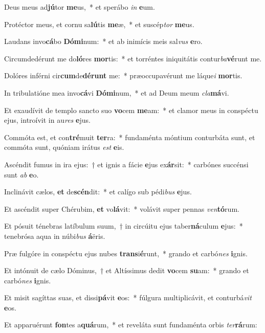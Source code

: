 \item Deus meus ad\textbf{jú}tor \textbf{me}us,~* et sperábo \textit{in} \textbf{e}um.
\item Protéctor meus, et cornu sa\textbf{lú}tis \textbf{me}æ,~* et suscép\textit{tor} \textbf{me}us.
\item Laudans invo\textbf{cá}bo \textbf{Dó}\textbf{mi}num:~* et ab inimícis meis sal\textit{vus} \textbf{e}ro.
\item Circumdedérunt me do\textbf{ló}res \textbf{mor}tis:~* et torréntes iniquitátis contur\textit{ba}\textbf{vé}runt me.
\item Dolóres inférni cir\textbf{cum}de\textbf{dé}\textbf{runt} me:~* præoccupavérunt me láque\textit{i} \textbf{mor}tis.
\item In tribulatióne mea invo\textbf{cá}vi \textbf{Dó}\textbf{mi}num,~* et ad Deum meum \textit{cla}\textbf{má}vi.
\item Et exaudívit de templo sancto suo \textbf{vo}cem \textbf{me}am:~* et clamor meus in conspéctu ejus, introívit in au\textit{res} \textbf{e}jus.
\item Commóta est, et con\textbf{tré}muit \textbf{ter}ra:~* fundaménta móntium conturbáta sunt, et commóta sunt, quóniam irátus \textit{est} \textbf{e}is.
\item Ascéndit fumus in ira ejus:~† et ignis a fácie \textbf{e}jus ex\textbf{ár}sit:~* carbónes succénsi sunt \textit{ab} \textbf{e}o.
\item Inclinávit cælos, \textbf{et} de\textbf{scén}dit:~* et calígo sub pédi\textit{bus} \textbf{e}jus.
\item Et ascéndit super Chérubim, \textbf{et} vo\textbf{lá}vit:~* volávit super pennas \textit{ven}\textbf{tó}rum.
\item Et pósuit ténebras latíbulum suum,~† in circúitu ejus taber\textbf{ná}culum \textbf{e}jus:~* tenebrósa aqua in núbi\textit{bus} \textbf{á}ëris.
\item Præ fulgóre in conspéctu ejus nubes \textbf{trans}i\textbf{é}runt,~* grando et carbó\textit{nes} \textbf{i}gnis.
\item Et intónuit de cælo Dóminus,~† et Altíssimus dedit \textbf{vo}cem \textbf{su}am:~* grando et carbó\textit{nes} \textbf{i}gnis.
\item Et misit sagíttas suas, et dissi\textbf{pá}vit \textbf{e}os:~* fúlgura multiplicávit, et conturbá\textit{vit} \textbf{e}os.
\item Et apparuérunt \textbf{fon}tes a\textbf{quá}rum,~* et reveláta sunt fundaménta orbis \textit{ter}\textbf{rá}rum:
